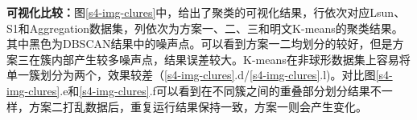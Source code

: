 \textbf{可视化比较：}图\ref{s4-img-clures}中，给出了聚类的可视化结果，行依次对应Lsun、S1和Aggregation数据集，列依次为方案一、二、三和明文K-means的聚类结果。其中黑色为DBSCAN结果中的噪声点。可以看到方案一二均划分的较好，但是方案三在簇内部产生较多噪声点，结果误差较大。K-means在非球形数据集上容易将单一簇划分为两个，效果较差（\ref{s4-img-clures}.d/\ref{s4-img-clures}.l)。对比图\ref{s4-img-clures}.e和\ref{s4-img-clures}.f可以看到在不同簇之间的重叠部分划分结果不一样，方案二打乱数据后，重复运行结果保持一致，方案一则会产生变化。
\begin{figure}[htb]
	\centering
	 \\

\end{figure}

